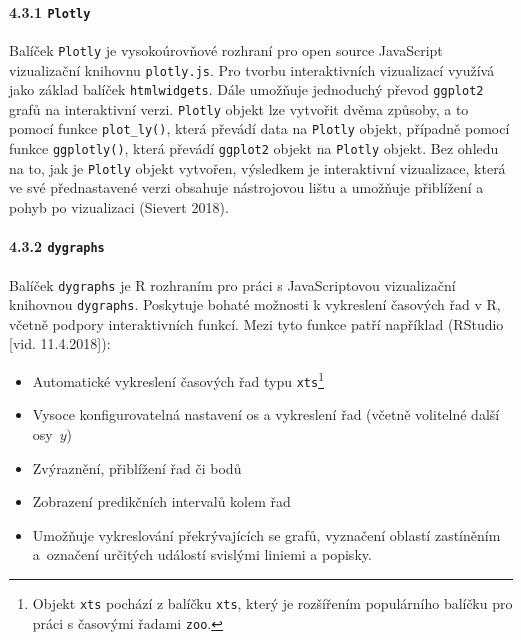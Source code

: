 \documentclass[12pt,]{article}
\providecommand{\tightlist}{%
  \setlength{\itemsep}{0pt}\setlength{\parskip}{0pt}}
\let\oldparagraph\paragraph
\renewcommand{\paragraph}[1]{\oldparagraph{#1}\mbox{}}
\let\rmarkdownfootnote\footnote%
\def\footnote{\protect\rmarkdownfootnote}
\begin{document}
\hypertarget{plotly}{\paragraph{\texorpdfstring{4.3.1
\texttt{Plotly}}{4.3.1 Plotly}}\label{plotly}}

\qquad Balíček \texttt{Plotly} je vysokoúrovňové rozhraní pro open
source JavaScript vizualizační knihovnu \texttt{plotly.js}. Pro tvorbu
interaktivních vizualizací využívá jako základ balíček
\texttt{htmlwidgets}. Dále umožňuje jednoduchý převod \texttt{ggplot2}
grafů na interaktivní verzi. \texttt{Plotly} objekt lze vytvořit dvěma
způsoby, a to pomocí funkce \texttt{plot\_ly()}, která převádí data na
\texttt{Plotly} objekt, případně pomocí funkce \texttt{ggplotly()},
která převádí \texttt{ggplot2} objekt na \texttt{Plotly} objekt. Bez
ohledu na to, jak je \texttt{Plotly} objekt vytvořen, výsledkem je
interaktivní vizualizace, která ve své přednastavené verzi obsahuje
nástrojovou lištu a umožňuje přiblížení a pohyb po vizualizaci (Sievert
2018).

\hypertarget{dygraphs}{\paragraph{\texorpdfstring{4.3.2
\texttt{dygraphs}}{4.3.2 dygraphs}}\label{dygraphs}}

\qquad Balíček \texttt{dygraphs} je R rozhraním pro práci s
JavaScriptovou vizualizační knihovnou \texttt{dygraphs}. Poskytuje
bohaté možnosti k vykreslení časových řad v R, včetně podpory
interaktivních funkcí. Mezi tyto funkce patří například (RStudio {[}vid.
11.4.2018{]}):

\begin{itemize}
\tightlist
\item
  Automatické vykreslení časových řad typu \texttt{xts}\footnote{Objekt
    \texttt{xts} pochází z balíčku \texttt{xts}, který je rozšířením
    populárního balíčku pro práci s časovými řadami \texttt{zoo}.}
\item
  Vysoce konfigurovatelná nastavení os a vykreslení řad (včetně
  volitelné další osy~\(y\))
\item
  Zvýraznění, přiblížení řad či bodů
\item
  Zobrazení predikčních intervalů kolem řad
\item
  Umožňuje vykreslování překrývajících se grafů, vyznačení oblastí
  zastíněním a~označení určitých událostí svislými liniemi a popisky.
\end{itemize}
\end{document}
